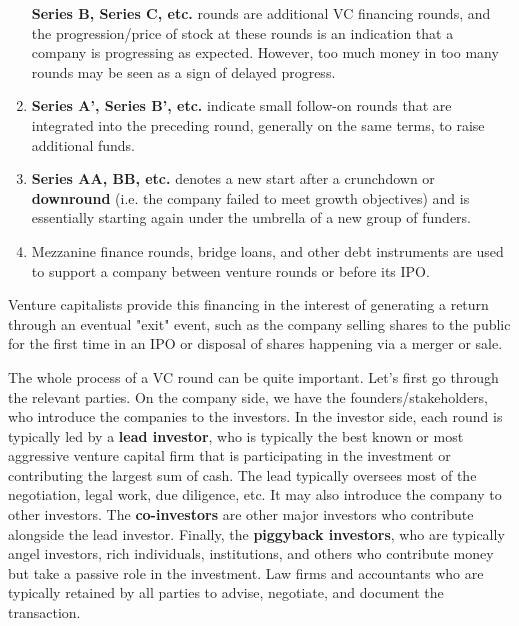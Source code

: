 \documentclass{article}
\begin{document}
\begin{definition}
\begin{enumerate}
        \textbf{Series B, Series C, etc.} rounds are additional VC financing rounds, and the progression/price of stock at these rounds is an indication that a company is progressing as expected. However, too much money in too many rounds may be seen as a sign of delayed progress.
        \item \textbf{Series A', Series B', etc.} indicate small follow-on rounds that are integrated into the preceding round, generally on the same terms, to raise additional funds. 
        \item \textbf{Series AA, BB, etc. } denotes a new start after a crunchdown or \textbf{downround} (i.e. the company failed to meet growth objectives) and is essentially starting again under the umbrella of a new group of funders. 
        \item Mezzanine finance rounds, bridge loans, and other debt instruments are used to support a company between venture rounds or before its IPO. 
      \end{enumerate}
      Venture capitalists provide this financing in the interest of generating a return through an eventual "exit" event, such as the company selling shares to the public for the first time in an IPO or disposal of shares happening via a merger or sale. 
    \end{definition}

    The whole process of a VC round can be quite important. Let's first go through the relevant parties. On the company side, we have the founders/stakeholders, who introduce the companies to the investors. In the investor side, each round is typically led by a \textbf{lead investor}, who is typically the best known or most aggressive venture capital firm that is participating in the investment or contributing the largest sum of cash. The lead typically oversees most of the negotiation, legal work, due diligence, etc. It may also introduce the company to other investors. The \textbf{co-investors} are other major investors who contribute alongside the lead investor. Finally, the \textbf{piggyback investors}, who are typically angel investors, rich individuals, institutions, and others who contribute money but take a passive role in the investment. Law firms and accountants who are typically retained by all parties to advise, negotiate, and document the transaction. 
\end{document}

